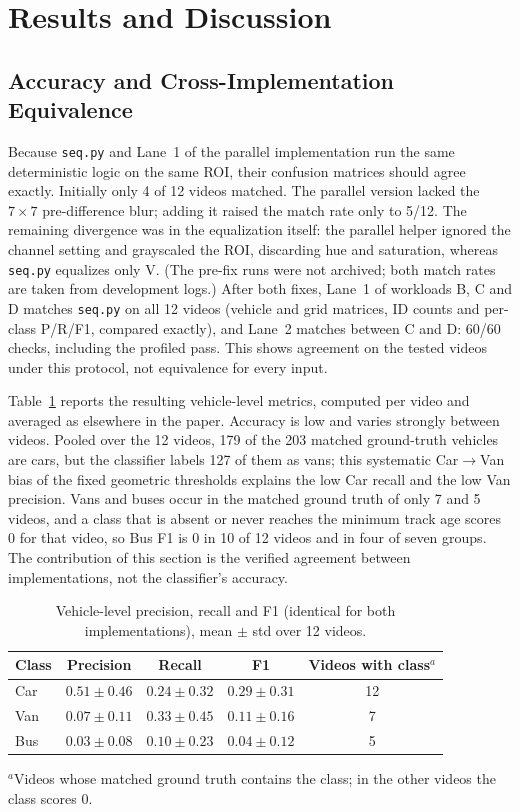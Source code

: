 \documentclass[conference]{IEEEtran}
\newcommand{\code}[1]{\texttt{#1}}
\begin{document}
\section{Results and Discussion}
\label{sec:results}

\subsection{Accuracy and Cross-Implementation Equivalence}
\label{sec:crosscheck}
Because \code{seq.py} and Lane~1 of the parallel implementation run the
same deterministic logic on the same ROI, their confusion matrices should
agree exactly. Initially only 4 of 12 videos matched. The parallel
version lacked the $7\times7$ pre-difference blur; adding it raised the
match rate only to 5/12. The remaining divergence was in the
equalization itself: the parallel helper ignored the channel setting and
grayscaled the ROI, discarding hue and saturation, whereas \code{seq.py}
equalizes only V. (The pre-fix runs were not archived; both match rates
are taken from development logs.) After both fixes, Lane~1 of
workloads B, C and D matches \code{seq.py} on all 12 videos
(vehicle and grid matrices, ID counts and per-class P/R/F1, compared
exactly), and Lane~2 matches between C and D: 60/60 checks, including the
profiled pass. This shows agreement on the tested videos under this
protocol, not equivalence for every input.

Table~\ref{tab:prf} reports the resulting
vehicle-level metrics, computed per video and averaged as elsewhere in
the paper. Accuracy is low and varies strongly between videos. Pooled
over the 12 videos, 179 of the 203 matched ground-truth vehicles are
cars, but the classifier labels 127 of them as vans; this systematic
Car$\to$Van bias of the fixed geometric thresholds explains the low Car
recall and the low Van precision. Vans and buses occur in the matched
ground truth of only 7 and 5 videos, and a class that is absent or never
reaches the minimum track age scores 0 for that video, so Bus F1 is 0 in
10 of 12 videos and in four of seven groups. The contribution of this
section is the verified agreement between implementations, not the
classifier's accuracy.

\begin{table}[t]
\centering
\caption{Vehicle-level precision, recall and F1 (identical for both
implementations), mean $\pm$ std over 12 videos.}
\label{tab:prf}
\scriptsize
\setlength{\tabcolsep}{4pt}
\begin{tabular}{lcccc}
\toprule
\textbf{Class} & \textbf{Precision} & \textbf{Recall} & \textbf{F1} & \textbf{Videos with class$^{a}$} \\
\midrule
Car & $0.51\pm0.46$ & $0.24\pm0.32$ & $0.29\pm0.31$ & 12 \\
Van & $0.07\pm0.11$ & $0.33\pm0.45$ & $0.11\pm0.16$ & 7 \\
Bus & $0.03\pm0.08$ & $0.10\pm0.23$ & $0.04\pm0.12$ & 5 \\
\bottomrule
\end{tabular}

\smallskip
\parbox{\columnwidth}{\scriptsize $^{a}$Videos whose matched ground truth
contains the class; in the other videos the class scores 0.}
\end{table}
\end{document}
